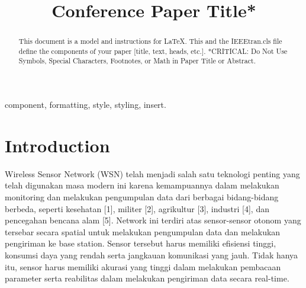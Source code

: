 \documentclass[conference]{IEEEtran}
\begin{document}
\title{Conference Paper Title*\\
}

\author{
}

\maketitle

\begin{abstract}
This document is a model and instructions for \LaTeX.
This and the IEEEtran.cls file define the components of your paper [title, text, heads, etc.]. *CRITICAL: Do Not Use Symbols, Special Characters, Footnotes, 
or Math in Paper Title or Abstract.
\end{abstract}

\begin{IEEEkeywords}
component, formatting, style, styling, insert.
\end{IEEEkeywords}

\section{Introduction}
Wireless Sensor Network (WSN) telah menjadi salah satu teknologi penting yang telah digunakan masa modern ini karena kemampuannya dalam melakukan monitoring dan melakukan pengumpulan data dari berbagai bidang-bidang berbeda, seperti kesehatan [1], militer [2], agrikultur [3], industri [4], dan pencegahan bencana alam [5]. Network ini terdiri atas sensor-sensor otonom yang tersebar secara spatial untuk melakukan pengumpulan data dan melakukan pengiriman ke base station. Sensor tersebut harus memiliki efisiensi tinggi, konsumsi daya yang rendah serta jangkauan komunikasi yang jauh. Tidak hanya itu, sensor harus memiliki akurasi yang tinggi dalam melakukan pembacaan parameter serta reabilitas dalam melakukan pengiriman data secara real-time. 
\end{document}
